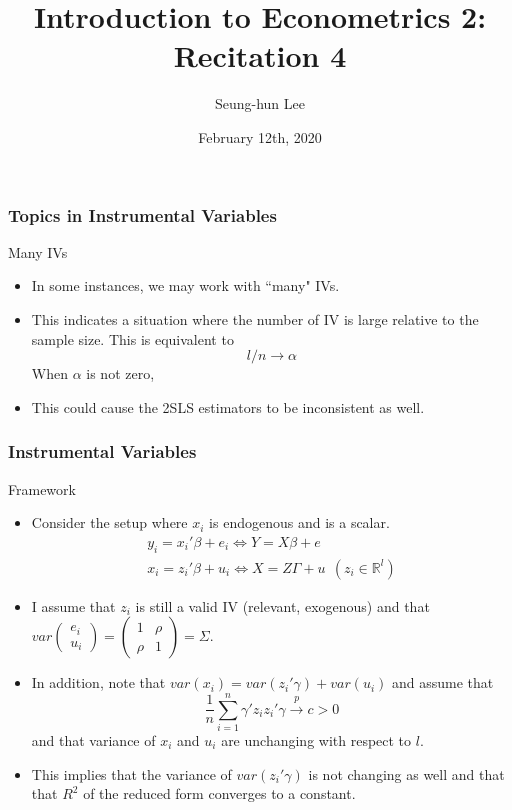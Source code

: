\documentclass{beamer}
\title[Econometrics 2]{Introduction to Econometrics 2: Recitation 4} %
\author{Seung-hun Lee}
\institute{Columbia University}
\date{February 12th, 2020}
\begin{document}
\begin{frame}
\titlepage
\end{frame}


\begin{frame}
\frametitle{Topics in Instrumental Variables}
Many IVs
\begin{itemize}
\item In some instances, we may work with ``many" IVs. 
\item This indicates a situation where the number of IV is large relative to the sample size. This is equivalent to 
\[
l/n \to \alpha 
\]
When $\alpha$ is not zero,
\item This could cause the 2SLS estimators to be inconsistent as well.
\end{itemize}
\end{frame}



\begin{frame}
\frametitle{Instrumental Variables}
Framework
\begin{itemize}
\item Consider the setup where $x_i$ is endogenous and is a scalar. 
\begin{gather*}
y_ i = x_i'\beta+e_i \iff Y=X\beta+e \\
x_i = z_i'\beta+u_i \iff X=Z\Gamma+u \ \ (z_i \in \mathbb{R}^l)
\end{gather*}
\item I assume that $z_i$ is still a valid IV (relevant, exogenous) and that $var\begin{pmatrix} e_i \\ u_i \end{pmatrix} = \begin{pmatrix}1 & \rho \\ \rho & 1 \end{pmatrix} = \Sigma$. 
\item In addition, note that $var(x_i) = var(z_i'\gamma)+var(u_i)$ and assume that
\[
\frac{1}{n}\sum_{i=1}^n \gamma'z_iz_i'\gamma\xrightarrow{p}c>0
\]
and that variance of $x_i$ and $u_i$ are unchanging with respect to $l$.
\item  This implies that the variance of $var(z_i'\gamma)$ is not changing as well and that that $R^2$ of the reduced form converges to a constant.
\end{itemize}
\end{frame}
\end{document}

